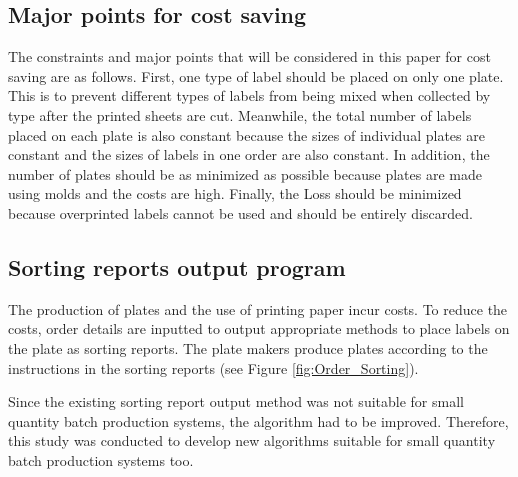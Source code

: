 \documentclass[a4paper]{amsart}
\numberwithin{equation}{section} %
\numberwithin{figure}{section} %
\numberwithin{table}{section}
\theoremstyle{plain}
\theoremstyle{definition}
\theoremstyle{plain}
\theoremstyle{plain}
\theoremstyle{plain}
\theoremstyle{plain}
\theoremstyle{plain}
\begin{document}
\subsection{Major points for cost saving}\label{subsec:CostSave}
The constraints and major points that will be considered in this paper for cost saving are as follows. 
First, one type of label should be placed on only one plate. 
This is to prevent different types of labels from being mixed when collected by type after the printed sheets are cut. 
Meanwhile, the total number of labels placed on each plate is also constant because the sizes of individual plates are constant and the sizes of labels in one order are also constant. 
In addition, the number of plates should be as minimized as possible because plates are made using molds and the costs are high. 
Finally, the Loss should be minimized because overprinted labels cannot be used and should be entirely discarded.

\subsection{Sorting reports output program}\label{subsec:SortProgram}
The production of plates and the use of printing paper incur costs. To reduce the costs, order details are inputted to output appropriate methods to place labels on the plate as sorting reports. The plate makers produce plates according to the instructions in the sorting reports (see Figure \ref{fig:Order_Sorting}).

Since the existing sorting report output method was not suitable for small quantity batch production systems, the algorithm had to be improved. Therefore, this study was conducted to develop new algorithms suitable for small quantity batch production systems too.
\end{document}
